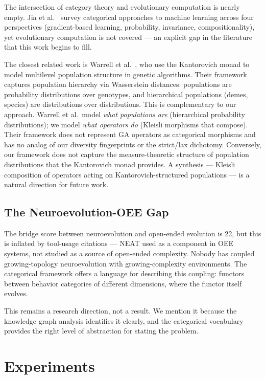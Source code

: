 \documentclass[10pt]{article}
\begin{document}
The intersection of category theory and evolutionary computation is nearly empty. Jia et al.~\cite{jia2025} survey categorical approaches to machine learning across four perspectives (gradient-based learning, probability, invariance, compositionality), yet evolutionary computation is not covered --- an explicit gap in the literature that this work begins to fill.

The closest related work is Warrell et al.~\cite{warrell2024}, who use the Kantorovich monad to model multilevel population structure in genetic algorithms. Their framework captures population hierarchy via Wasserstein distances: populations are probability distributions over genotypes, and hierarchical populations (demes, species) are distributions over distributions. This is complementary to our approach. Warrell et al.\ model \emph{what populations are} (hierarchical probability distributions); we model \emph{what operators do} (Kleisli morphisms that compose). Their framework does not represent GA operators as categorical morphisms and has no analog of our diversity fingerprints or the strict/lax dichotomy. Conversely, our framework does not capture the measure-theoretic structure of population distributions that the Kantorovich monad provides. A synthesis --- Kleisli composition of operators acting on Kantorovich-structured populations --- is a natural direction for future work.

\subsection{The Neuroevolution-OEE Gap}

The bridge score between neuroevolution and open-ended evolution is 22, but this is inflated by tool-usage citations --- NEAT used as a component in OEE systems, not studied as a source of open-ended complexity. Nobody has coupled growing-topology neuroevolution with growing-complexity environments. The categorical framework offers a language for describing this coupling: functors between behavior categories of different dimensions, where the functor itself evolves.

This remains a research direction, not a result. We mention it because the knowledge graph analysis identifies it clearly, and the categorical vocabulary provides the right level of abstraction for stating the problem.

\section{Experiments}
\end{document}
